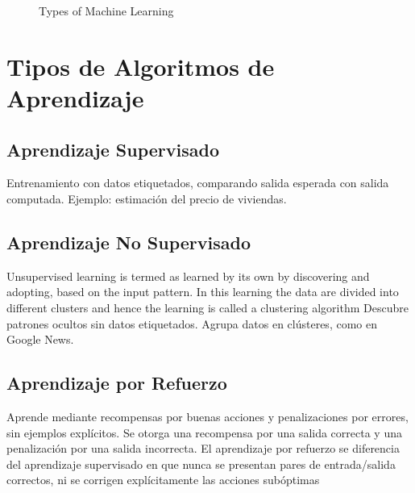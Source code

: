 \documentclass[12pt]{article}
\begin{document}
\begin{figure}[h!]
\centering
{}
\caption{Types of Machine Learning}
\end{figure}


\section{Tipos de Algoritmos de Aprendizaje}
\subsection{Aprendizaje Supervisado}
Entrenamiento con datos etiquetados, comparando salida esperada con salida computada. Ejemplo: estimaci\'on del precio de viviendas.

\subsection{Aprendizaje No Supervisado}
Unsupervised learning is termed as learned by its own by discovering and adopting, based on the input pattern. In this  learning the data are divided into different clusters and hence the learning is called a clustering algorithm Descubre patrones ocultos sin datos etiquetados. Agrupa datos en cl\'usteres, como en Google News.

\subsection{Aprendizaje por Refuerzo}
Aprende mediante recompensas por buenas acciones y penalizaciones por errores, sin ejemplos expl\'icitos. Se otorga una recompensa por una salida correcta y una penalización por una salida incorrecta. El aprendizaje por refuerzo se diferencia del aprendizaje supervisado en que nunca se presentan pares de entrada/salida correctos, ni se corrigen explícitamente las acciones subóptimas
\end{document}
